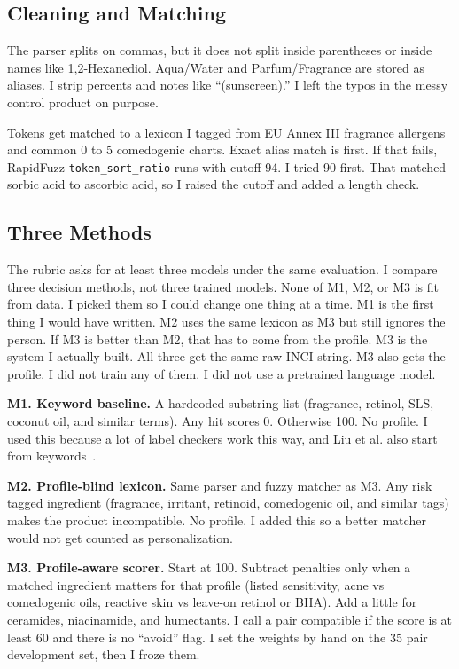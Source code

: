 \documentclass[conference]{IEEEtran}
\begin{document}
\subsection{Cleaning and Matching}
The parser splits on commas, but it does not split inside parentheses or inside names like 1,2-Hexanediol. Aqua/Water and Parfum/Fragrance are stored as aliases. I strip percents and notes like ``(sunscreen).'' I left the typos in the messy control product on purpose.

Tokens get matched to a lexicon I tagged from EU Annex III fragrance allergens~\cite{eu1223} and common 0 to 5 comedogenic charts. Exact alias match is first. If that fails, RapidFuzz \texttt{token\_sort\_ratio} runs with cutoff 94. I tried 90 first. That matched sorbic acid to ascorbic acid, so I raised the cutoff and added a length check.

\subsection{Three Methods}
The rubric asks for at least three models under the same evaluation. I compare three decision methods, not three trained models. None of M1, M2, or M3 is fit from data. I picked them so I could change one thing at a time. M1 is the first thing I would have written. M2 uses the same lexicon as M3 but still ignores the person. If M3 is better than M2, that has to come from the profile. M3 is the system I actually built. All three get the same raw INCI string. M3 also gets the profile. I did not train any of them. I did not use a pretrained language model.

\textbf{M1. Keyword baseline.} A hardcoded substring list (fragrance, retinol, SLS, coconut oil, and similar terms). Any hit scores 0. Otherwise 100. No profile. I used this because a lot of label checkers work this way, and Liu et al. also start from keywords~\cite{liu2024beauty}.

\textbf{M2. Profile-blind lexicon.} Same parser and fuzzy matcher as M3. Any risk tagged ingredient (fragrance, irritant, retinoid, comedogenic oil, and similar tags) makes the product incompatible. No profile. I added this so a better matcher would not get counted as personalization.

\textbf{M3. Profile-aware scorer.} Start at 100. Subtract penalties only when a matched ingredient matters for that profile (listed sensitivity, acne vs comedogenic oils, reactive skin vs leave-on retinol or BHA). Add a little for ceramides, niacinamide, and humectants. I call a pair compatible if the score is at least 60 and there is no ``avoid'' flag. I set the weights by hand on the 35 pair development set, then I froze them.
\end{document}
